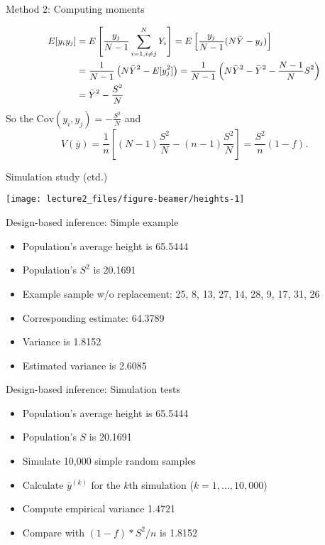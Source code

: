 \documentclass[
  ignorenonframetext,
]{beamer}
\providecommand{\tightlist}{%
  \setlength{\itemsep}{0pt}\setlength{\parskip}{0pt}}
\begin{document}
\begin{frame}{Method 2: Computing moments}
\protect\hypertarget{method-2-computing-moments}{}

\[ \small
\begin{aligned}
E[y_i y_j ] &= E \left[ \frac{y_j}{N-1} \sum_{i=1, i \neq j}^N Y_i \right] = E \left[ \frac{y_j}{N-1} (N \bar Y - y_j) \right]\\
&= \frac{1}{N-1} \left( N \bar Y^2 - E [ y_j^2 ] \right) = \frac{1}{N-1} \left( N \bar Y^2 - \bar Y^2 - \frac{N-1}{N} S^2   \right) \\
&= \bar Y^2 - \frac{S^2}{N}
\end{aligned}
\] So the \(\text{Cov} (y_i, y_j) = - \frac{S^2}{N}\) and \[
 V(\bar y) = \frac{1}{n} \left[ (N-1)\frac{S^2}{N} - (n-1) \frac{S^2}{N}  \right] = \frac{S^2}{n} (1-f).
\]

\end{frame}

\begin{frame}{Simulation study (ctd.)}
\protect\hypertarget{simulation-study-ctd.}{}

\begin{center}\texttt{[image: lecture2\_files/figure-beamer/heights-1]} \end{center}

\end{frame}

\begin{frame}{Design-based inference: Simple example}
\protect\hypertarget{design-based-inference-simple-example}{}

\begin{itemize}
\tightlist
\item
  Population's average height is 65.5444
\item
  Population's \(S^2\) is 20.1691
\item
  Example sample w/o replacement: 25, 8, 13, 27, 14, 28, 9, 17, 31, 26
\item
  Corresponding estimate: 64.3789
\item
  Variance is 1.8152
\item
  Estimated variance is 2.6085
\end{itemize}

\end{frame}

\begin{frame}{Design-based inference: Simulation tests}
\protect\hypertarget{design-based-inference-simulation-tests}{}

\begin{itemize}
\tightlist
\item
  Population's average height is 65.5444
\item
  Population's \(S\) is 20.1691
\item
  Simulate 10,000 simple random samples
\item
  Calculate \(\bar y^{(k)}\) for the \(k\)th simulation
  (\(k=1,\ldots, 10,000\))
\item
  Compute empirical variance 1.4721
\item
  Compare with \((1-f)*S^2/n\) is 1.8152
\end{itemize}

\end{frame}
\end{document}
